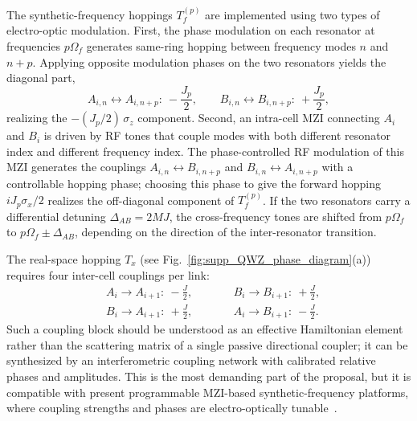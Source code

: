 \documentclass[aps,prl,twocolumn,preprintnumbers,amsmath,amssymb,superscriptaddress,10pt]{revtex4-2}
\begin{document}
The synthetic-frequency hoppings $T_f^{(p)}$ are implemented using two types of electro-optic modulation. First, the phase modulation on each resonator at frequencies $p\Omega_f$ generates same-ring hopping between frequency modes $n$ and $n+p$. Applying opposite modulation phases on the two resonators yields the diagonal part,
\begin{equation}
A_{i,n}\leftrightarrow A_{i,n+p}:\ -\frac{J_p}{2},
\qquad
B_{i,n}\leftrightarrow B_{i,n+p}:\ +\frac{J_p}{2},
\end{equation}
realizing the $-(J_p/2)\,\sigma_z$ component. Second, an intra-cell MZI connecting $A_i$ and $B_i$ is driven by RF tones that couple modes with both different resonator index and different frequency index. The phase-controlled RF modulation of this MZI generates the couplings $A_{i,n}\leftrightarrow B_{i,n+p}$ and
$B_{i,n}\leftrightarrow A_{i,n+p}$ with a controllable hopping phase; choosing this phase to give the forward hopping $iJ_p\sigma_x/2$ realizes the off-diagonal component of $T_f^{(p)}$. If the two resonators carry a differential detuning $\Delta_{AB}=2MJ$, the cross-frequency tones are shifted from $p\Omega_f$ to
$p\Omega_f\pm\Delta_{AB}$, depending on the direction of the inter-resonator transition.


The real-space hopping $T_x$ (see Fig.~\ref{fig:supp_QWZ_phase_diagram}(a)) requires four inter-cell
couplings per link:
\begin{equation}
\begin{aligned}
&A_i\to A_{i+1}:\ -\tfrac{J}{2},\qquad
&&B_i\to B_{i+1}:\ +\tfrac{J}{2}, \\
&B_i\to A_{i+1}:\ +\tfrac{J}{2},\qquad
&&A_i\to B_{i+1}:\ -\tfrac{J}{2}.
\end{aligned}
\end{equation}
Such a coupling block should be understood as an effective Hamiltonian
element rather than the scattering matrix of a single passive
directional coupler; it can be synthesized by an interferometric
coupling network with calibrated relative phases and
amplitudes. This is the most demanding part of the proposal, but it is
compatible with present programmable MZI-based synthetic-frequency
platforms, where coupling strengths and phases are electro-optically
tunable~\cite{wang2025versatile}.
\end{document}
